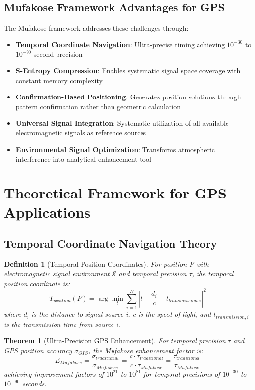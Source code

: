 \documentclass[12pt,a4paper]{article}
\newtheorem{theorem}{Theorem}
\newtheorem{definition}{Definition}
\begin{document}
\subsection{Mufakose Framework Advantages for GPS}

The Mufakose framework addresses these challenges through:

\begin{itemize}
\item \textbf{Temporal Coordinate Navigation}: Ultra-precise timing achieving $10^{-30}$ to $10^{-90}$ second precision
\item \textbf{S-Entropy Compression}: Enables systematic signal space coverage with constant memory complexity
\item \textbf{Confirmation-Based Positioning}: Generates position solutions through pattern confirmation rather than geometric calculation
\item \textbf{Universal Signal Integration}: Systematic utilization of all available electromagnetic signals as reference sources
\item \textbf{Environmental Signal Optimization}: Transforms atmospheric interference into analytical enhancement tool
\end{itemize}

\section{Theoretical Framework for GPS Applications}

\subsection{Temporal Coordinate Navigation Theory}

\begin{definition}[Temporal Position Coordinates]
For position P with electromagnetic signal environment $\mathcal{S}$ and temporal precision $\tau$, the temporal position coordinate is:
\begin{equation}
T_{position}(P) = \arg\min_{t} \sum_{i=1}^{N} \left| t - \frac{d_i}{c} - t_{transmission,i} \right|^2
\end{equation}
where $d_i$ is the distance to signal source i, c is the speed of light, and $t_{transmission,i}$ is the transmission time from source i.
\end{definition}

\begin{theorem}[Ultra-Precision GPS Enhancement]
For temporal precision $\tau$ and GPS position accuracy $\sigma_{GPS}$, the Mufakose enhancement factor is:
\begin{equation}
E_{Mufakose} = \frac{\sigma_{traditional}}{\sigma_{Mufakose}} = \frac{c \cdot \tau_{traditional}}{c \cdot \tau_{Mufakose}} = \frac{\tau_{traditional}}{\tau_{Mufakose}}
\end{equation}
achieving improvement factors of $10^{21}$ to $10^{81}$ for temporal precisions of $10^{-30}$ to $10^{-90}$ seconds.
\end{theorem}
\end{document}
